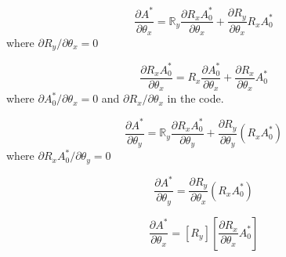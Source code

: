 \documentclass[12pt, letterpaper]{article}
\begin{document}
\begin{equation}
  \frac{\partial A^{*}}{\partial \theta_{x}}
    = \mathbb{R}_{y} \frac{\partial R_{x} A_{0}^{*}}{\partial \theta_{x}} +
      \frac{\partial R_{y}}{\partial \theta_{x}} R_{x} A_{0}^{*}
\end{equation}
where  $\partial R_{y} / \partial \theta_{x} = 0$

\begin{equation}
  \frac{\partial R_{x} A_{0}^{*}}{\partial \theta_{x}}
    = R_{x} \frac{\partial A_{0}^{*}}{\partial \theta_{x}} +
      \frac{\partial R_{x}}{\partial \theta_{x}} A_{0}^{*}
\end{equation}
where $\partial A_{0}^{*} / \partial \theta_{x} = 0$ and $\partial
R_{x} / \partial \theta_{x}$ in the code.


\begin{equation}
  \frac{\partial A^{*}}{\partial \theta_{y}}
    = \mathbb{R}_{y} \frac{\partial R_{x} A_{0}^{*}}{\partial \theta_{y}} +
      \frac{\partial R_{y}}{\partial \theta_{y}} (R_{x} A_{0}^{*})
\end{equation}
where $\partial R_{x} A_{0}^{*} / \partial \theta_{y} = 0$

\begin{equation}
  \frac{\partial A^{*}}{\partial \theta_{y}}
    = \frac{\partial R_{y}}{\partial \theta_{x}} (R_{x} A_{0}^{*})
\end{equation}

\begin{equation}
  \frac{\partial A^{*}}{\partial \theta_{x}}
    = [R_{y}] \left[ \frac{\partial R_{x}}{\partial \theta_{x}} A_{0}^{*} \right]
\end{equation}
\end{document}
